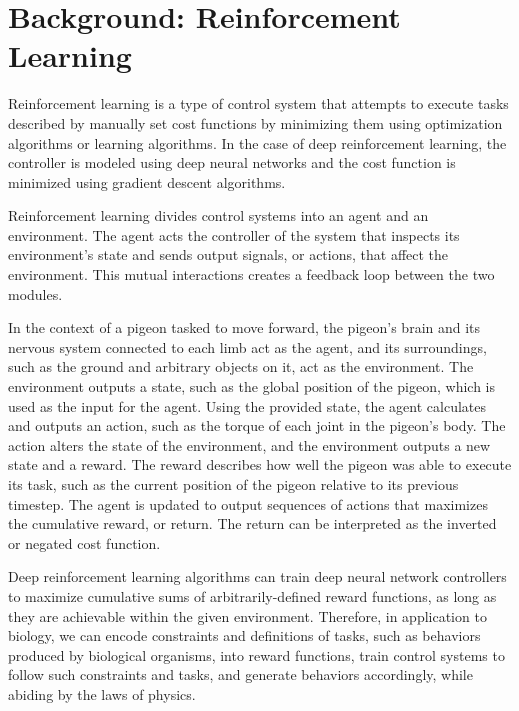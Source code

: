 \chapter{Background: Reinforcement Learning} \label{ch:background}
  Reinforcement learning is a type of control system that attempts to execute tasks described by manually set cost functions by minimizing them using optimization algorithms or learning algorithms. In the case of deep reinforcement learning, the controller is modeled using deep neural networks and the cost function is minimized using gradient descent algorithms.

  Reinforcement learning divides control systems into an agent and an environment. The agent acts the controller of the system that inspects its environment's state and sends output signals, or actions, that affect the environment. This mutual interactions creates a feedback loop between the two modules.

  In the context of a pigeon tasked to move forward, the pigeon's brain and its nervous system connected to each limb act as the agent, and its surroundings, such as the ground and arbitrary objects on it, act as the environment. The environment outputs a state, such as the global position of the pigeon, which is used as the input for the agent. Using the provided state, the agent calculates and outputs an action, such as the torque of each joint in the pigeon's body. The action alters the state of the environment, and the environment outputs a new state and a reward. The reward describes how well the pigeon was able to execute its task, such as the current position of the pigeon relative to its previous timestep. The agent is updated to output sequences of actions that maximizes the cumulative reward, or return. The return can be interpreted as the inverted or negated cost function.

  Deep reinforcement learning algorithms can train deep neural network controllers to maximize cumulative sums of arbitrarily-defined reward functions, as long as they are achievable within the given environment. Therefore, in application to biology, we can encode constraints and definitions of tasks, such as behaviors produced by biological organisms, into reward functions, train control systems to follow such constraints and tasks, and generate behaviors accordingly, while abiding by the laws of physics.

